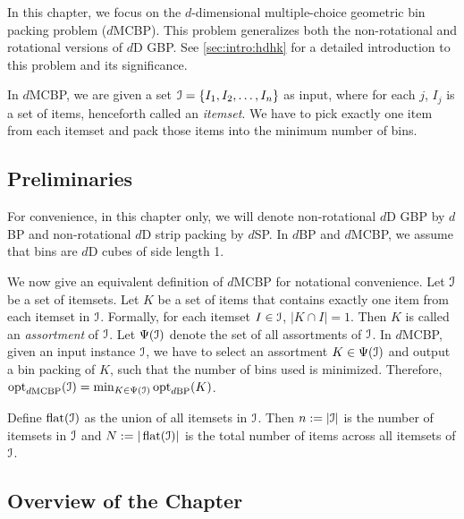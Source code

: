 In this chapter, we focus on the $d$-dimensional multiple-choice geometric
bin packing problem ($d$MCBP).
This problem generalizes both the non-rotational and rotational versions of $d$D GBP.
See \cref{sec:intro:hdhk} for a detailed introduction to this problem
and its significance.

In $d$MCBP, we are given a set $\mathcal{I} = \{I_1, I_2, \ldots, I_n\}$ as input,
where for each $j$, $I_j$ is a set of items, henceforth called an {\em itemset}.
We have to pick exactly one item from each itemset and pack those items
into the minimum number of bins.

\subsection*{Preliminaries}

For convenience, in this chapter only, we will denote non-rotational $d$D GBP by $d$BP
and non-rotational $d$D strip packing by $d$SP.
In $d$BP and $d$MCBP, we assume \wLoG{} that bins are $d$D cubes of side length 1.

We now give an equivalent definition of $d$MCBP for notational convenience.
Let $\mathcal{I}$ be a set of itemsets.
Let $K$ be a set of items that contains exactly one item from each itemset in $\mathcal{I}$.
Formally, for each itemset $I \in \mathcal{I}$, $|K \cap I| = 1$.
Then $K$ is called an \emph{assortment} of $\mathcal{I}$.
Let $\Psi(\mathcal{I})$ denote the set of all assortments of $\mathcal{I}$.
%
In $d$MCBP, given an input instance $\mathcal{I}$,
we have to select an assortment $K \in \Psi(\mathcal{I})$ and output a bin packing of $K$,
such that the number of bins used is minimized. Therefore,
$\operatorname{opt}_{d\mathrm{MCBP}}(\mathcal{I}) = \min_{K \in \Psi(\mathcal{I})} \operatorname{opt}_{d\mathrm{BP}}(K)$.

Define $\operatorname{flat}(\mathcal{I})$ as the union of all itemsets in $\mathcal{I}$.
Then $n := |\mathcal{I}|$ is the number of itemsets in $\mathcal{I}$
and $N := |\operatorname{flat}(\mathcal{I})|$ is the total number of items across all itemsets of $\mathcal{I}$.

\subsection*{Overview of the Chapter}

